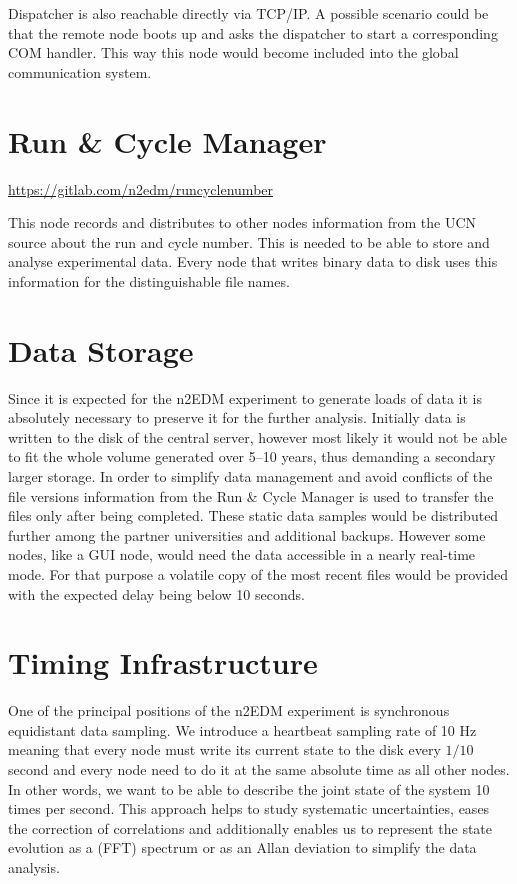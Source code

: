 Dispatcher is also reachable directly via TCP/IP. A possible scenario could be that the remote node boots up and asks the dispatcher to start a corresponding COM handler. This way this node would become included into the global communication system.

\section{Run \& Cycle Manager}
\label{sec:runcyclemanager}

\url{https://gitlab.com/n2edm/runcyclenumber}

This node records and distributes to other nodes information from the UCN source about the run and cycle number. This is needed to be able to store and analyse experimental data. Every node that writes binary data to disk uses this information for the distinguishable file names.

\section{Data Storage}
\label{sec:data_storage}

Since it is expected for the n2EDM experiment to generate loads of data it is absolutely necessary to preserve it for the further analysis. Initially data is written to the disk of the central server, however most likely it would not be able to fit the whole volume generated over 5--10 years, thus demanding a secondary larger storage. In order to simplify data management and avoid conflicts of the file versions information from the Run \& Cycle Manager is used to transfer the files only after being completed. These static data samples would be distributed further among the partner universities and additional backups. However some nodes, like a GUI node, would need the data accessible in a nearly real-time mode. For that purpose a volatile copy of the most recent files would be provided with the expected delay being below 10 seconds.

\section{Timing Infrastructure}
\label{sec:timing_infrastructure}

One of the principal positions \cite{Bison2018} of the n2EDM experiment is synchronous equidistant data sampling. We introduce a heartbeat sampling rate of 10 Hz meaning that every node must write its current state to the disk every $1/10$ second and every node need to do it at the same absolute time as all other nodes. In other words, we want to be able to describe the joint state of the system 10 times per second. This approach helps to study systematic uncertainties, eases the correction of correlations and additionally enables us to represent the state evolution as a (FFT) spectrum or as an Allan deviation to simplify the data analysis.

